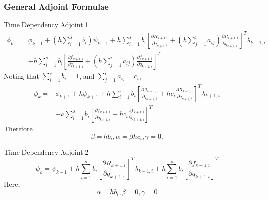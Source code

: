 \documentclass{beamer}
\newcommand{\pd}[2]{\frac{\partial #1}{\partial #2}}
\begin{document}
\begin{frame}[allowframebreaks] \frametitle{General Adjoint Formulae}

  \vspace{-0.25cm}

  \scriptsize{
    \begin{block}{Time Dependency Adjoint 1}
      \begin{equation}\nonumber
        \begin{split}
          \phi_k = & \phi_{k+1} + \left(h\sum_{i=1}^s b_i\right) \psi_{k+1}  + h \sum_{i=1}^sb_i \left[\pd{R_{k+1,i}}{\dot{q}_{k+1,i}} + \left( h \sum_{j=1}^i a_{ij} \right) \pd{R_{k+1,i}}{q_{k+1,i}} \right]^T \lambda_{k+1,i}  \\
          & + h \sum_{i=1}^sb_i \left[\pd{f_{k+1,i}}{\dot{q}_{k+1,i}} + \left( h \sum_{j=1}^i a_{ij} \right) \pd{f_{k+1,i}}{q_{k+1,i}} \right]^T
        \end{split}
      \end{equation}
      Noting that $\sum_{i=1}^s b_i = 1$, and $\sum_{j=1}^i a_{ij} = c_i$,
      \begin{equation}\nonumber
        \begin{split}
          \phi_k = & \phi_{k+1} + h \psi_{k+1}  + h \sum_{i=1}^sb_i \left[\pd{R_{k+1,i}}{\dot{q}_{k+1,i}} + hc_i \pd{R_{k+1,i}}{q_{k+1,i}} \right]^T \lambda_{k+1,i}  \\ &+ h \sum_{i=1}^sb_i \left[\pd{f_{k+1,i}}{\dot{q}_{k+1,i}} +hc_i \pd{f_{k+1,i}}{q_{k+1,i}} \right]^T
        \end{split}
      \end{equation}
      Therefore  $$\beta = hb_i, \alpha = \beta hc_i, \gamma = 0.$$
    \end{block}
  }

  \framebreak

  \normalsize{
    \begin{block}{Time Dependency Adjoint 2}
      \begin{equation}\nonumber
        \psi_k = \psi_{k+1} + h \sum_{i=1}^s b_i \left[ \pd{R_{k+1,i}}{q_{k+1,i}} \right]^T \lambda_{k+1,i} + h \sum_{i=1}^s b_i \left[ \pd{f_{k+1,i}}{q_{k+1,i}} \right]^T
      \end{equation}
      Here, $$ \alpha = hb_i, \beta = 0, \gamma = 0$$
    \end{block}
  }

  \framebreak


\end{frame}
\end{document}
